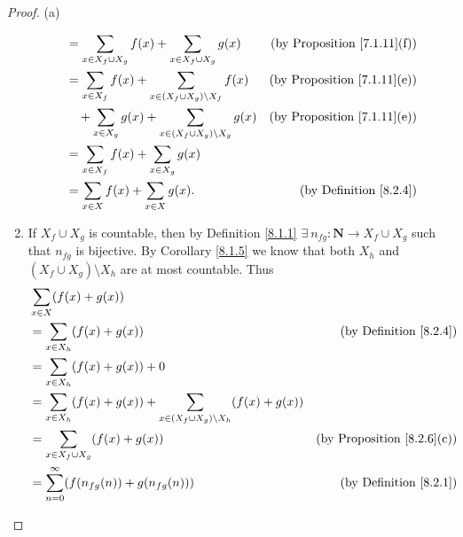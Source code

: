 \begin{proof}{(a)}
\begin{enumerate}[label=(\Roman*)]
\begin{align*}
                   & = \sum_{x \in X_f \cup X_g} f(x) + \sum_{x \in X_f \cup X_g} g(x)                          & \text{(by Proposition \ref{7.1.11}(f))} \\
                   & = \sum_{x \in X_f} f(x) + \sum_{x \in (X_f \cup X_g) \setminus X_f} f(x)                   & \text{(by Proposition \ref{7.1.11}(e))} \\
                   & \quad + \sum_{x \in X_g} g(x) + \sum_{x \in (X_f \cup X_g) \setminus X_g} g(x)             & \text{(by Proposition \ref{7.1.11}(e))} \\
                   & = \sum_{x \in X_f} f(x) + \sum_{x \in X_g} g(x)                                                                                      \\
                   & = \sum_{x \in X} f(x) + \sum_{x \in X} g(x).                                               & \text{(by Definition \ref{8.2.4})}
              \end{align*}
        \item If \(X_f \cup X_g\) is countable, then by Definition \ref{8.1.1} \(\exists\ n_{fg} : \mathbf{N} \to X_f \cup X_g\) such that \(n_{fg}\) is bijective.
              By Corollary \ref{8.1.5} we know that both \(X_h\) and \((X_f \cup X_g) \setminus X_h\) are at most countable.
              Thus
              \begin{align*}
                   & \sum_{x \in X} (f(x) + g(x))                                                                                                         \\
                   & = \sum_{x \in X_h} (f(x) + g(x))                                                           & \text{(by Definition \ref{8.2.4})}      \\
                   & = \sum_{x \in X_h} (f(x) + g(x)) + 0                                                                                                 \\
                   & = \sum_{x \in X_h} (f(x) + g(x)) + \sum_{x \in (X_f \cup X_g) \setminus X_h} (f(x) + g(x))                                           \\
                   & = \sum_{x \in X_f \cup X_g} (f(x) + g(x))                                                  & \text{(by Proposition \ref{8.2.6}(c))}  \\
                   & = \sum_{n = 0}^\infty (f(n_{fg}(n)) + g(n_{fg}(n)))                                        & \text{(by Definition \ref{8.2.1})}      \\

\end{align*}
\end{enumerate}
\end{proof}
